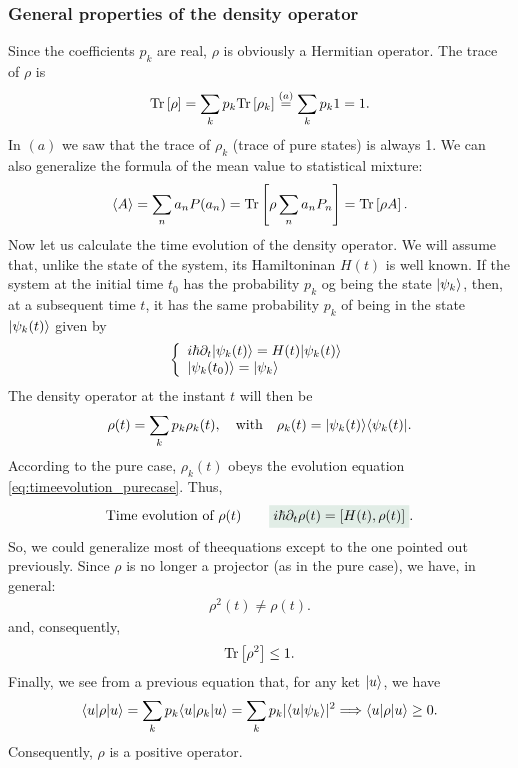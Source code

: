 \subsubsection{General properties of the density operator}
Since the coefficients $p_k$ are real, $\rho$ is obviously a Hermitian operator.
The trace of $\rho$ is
\begin{align*}
    \text{Tr}\left[\rho\right]=\sum_kp_k\text{Tr}\left[\rho_k\right]\stackrel{(a)}{=}\sum_kp_k1=1.
\end{align*}
In $(a)$ we saw that the trace of $\rho_k$ (trace of pure states) is always 1.
We can also generalize the formula of the mean value to statistical mixture:
\begin{align}
    \langle A\rangle=\sum_na_nP(a_n)=\text{Tr}\left[\rho\sum_na_nP_n\right]=\text{Tr}\left[\rho A\right].
\end{align}
Now let us calculate the time evolution of the density operator. We will assume that, unlike the state of the system, its Hamiltoninan $H(t)$ is well known.
If the system at the initial time $t_0$ has the probability $p_k$ og being the state $|\psi_k\rangle$, then, at a subsequent time $t$, it has the same probability $p_k$ of 
being in the state $|\psi_k(t)\rangle$ given by
\begin{align*}
    \left\{\begin{array}{l}
        i\hbar\partial_t|\psi_k(t)\rangle=H(t)|\psi_k(t)\rangle\\
        |\psi_k(t_0)\rangle=|\psi_k\rangle
    \end{array}\right.
\end{align*}
The density operator at the instant $t$ will then be 
\begin{align}
    \rho(t)=\sum_kp_k\rho_k(t),\quad\text{with}\quad \rho_k(t)=|\psi_k(t)\rangle\langle\psi_k(t)|.
\end{align}
According to the pure case, $\rho_k(t)$ obeys the evolution equation \eqref{eq:timeevolution_purecase}. Thus,
\begin{align}
\text{Time evolution of $\rho(t)$}\qquad\highlight{i\hbar\partial_t\rho(t)=[H(t),\rho(t)]}.
\end{align}
So, we could generalize most of theequations except to the one pointed out previously. Since $\rho$ is no longer a projector (as in the pure case), we have, in general:
\begin{align*}
    \rho^2(t)\neq\rho(t).
\end{align*}
and, consequently,
\begin{align*}
    \text{Tr}\left[\rho^2\right]\leq1.
\end{align*}
Finally, we see from a previous equation that, for any ket $|u\rangle$, we have 
\begin{align*}
    \langle u|\rho|u\rangle=\sum_kp_k\langle u|\rho_k|u\rangle=\sum_kp_k|\langle u|\psi_k\rangle|^2\Longrightarrow \langle u|\rho|u\rangle\geq0.
\end{align*}
Consequently, $\rho$ is a positive operator.
